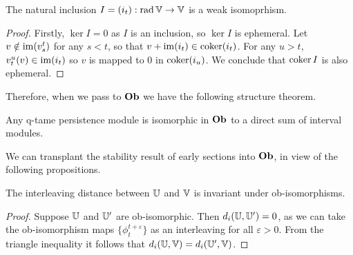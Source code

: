 \begin{proposition}
The natural inclusion $I = (i_t) : \operatorname{rad} \mathbb{V} \to \mathbb{V}$ is a weak isomoprhism.
\end{proposition}
\begin{proof}
Firstly, $\ker I = 0$ as $I$ is an inclusion, so $\ker I$ is ephemeral. Let $v \notin \operatorname{im}(v_s^t)$ for any $s < t$, so that $v + \operatorname{im}(i_t) \in \operatorname{coker}(i_t)$. For any $u > t$, $v_t^u(v) \in \operatorname{im}(i_t)$ so $v$ is mapped to $0$ in $\operatorname{coker}(i_u)$. We conclude that $\operatorname{coker} I$ is also ephemeral. 
\end{proof}

Therefore, when we pass to $\mathbf{Ob}$ we have the following structure theorem. 

\begin{theorem}
Any q-tame persistence module is isomorphic in $\mathbf{Ob}$ to a direct sum of interval modules.
\end{theorem}

We can transplant the stability result of early sections into $\mathbf{Ob}$, in view of the following propositions.

\begin{proposition}
The interleaving distance between $\mathbb{U}$ and $\mathbb{V}$ is invariant under ob-isomorphisms.
\end{proposition}
\begin{proof}
Suppose $\mathbb{U}$ and $\mathbb{U}'$ are ob-isomorphic. Then $d_i(\mathbb{U}, \mathbb{U}') = 0$, as we can take the ob-isomorphism maps $\{\phi_t^{t+\varepsilon}\}$ as an interleaving for all $\varepsilon > 0$. From the triangle inequality it follows that $d_i(\mathbb{U}, \mathbb{V}) = d_i(\mathbb{U}', \mathbb{V})$.
\end{proof}

